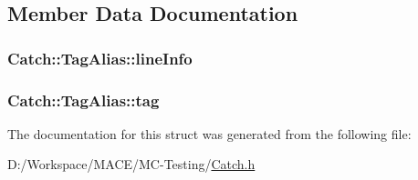 \subsection{Member Data Documentation}
\subsubsection[{\texorpdfstring{line\+Info}{lineInfo}}]{ Catch\+::\+Tag\+Alias\+::line\+Info}\hypertarget{struct_catch_1_1_tag_alias_a2f51fe0b3c052561275d26b6eb88f702}{}\label{struct_catch_1_1_tag_alias_a2f51fe0b3c052561275d26b6eb88f702}
\subsubsection[{\texorpdfstring{tag}{tag}}]{ Catch\+::\+Tag\+Alias\+::tag}\hypertarget{struct_catch_1_1_tag_alias_a950183883ab17c90d0fab16b966b6e2d}{}\label{struct_catch_1_1_tag_alias_a950183883ab17c90d0fab16b966b6e2d}


The documentation for this struct was generated from the following file\+:\begin{DoxyCompactItemize}
\item 
D\+:/\+Workspace/\+M\+A\+C\+E/\+M\+C-\/\+Testing/\hyperlink{_catch_8h}{Catch.\+h}\end{DoxyCompactItemize}
